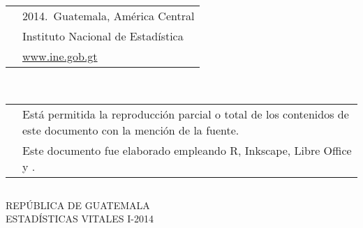 $\ $
\vspace{4.5cm}

\noindent\begin{tabular}{p{0.1cm}p{6.8cm}}
	& 2014.$\,$ Guatemala, América Central \\
	&\Bold Instituto Nacional de Estadística\\[-0.4cm]
	&\color{blue!50!black}\url{www.ine.gob.gt}\\[0.9cm]
\end{tabular}\\
\noindent\begin{tabular}{p{0.1cm}p{6.8cm}}
	& Está permitida la reproducción parcial o total de los contenidos de este documento con la mención de la fuente. \\[0.5cm]
	
	& Este documento fue elaborado empleando  {\Sans R}, Inkscape, Libre Office y {\Logos \XeLaTeX}.\\
\end{tabular} 


\clearpage




$\ $
\vspace{3.5cm}

\begin{center}
	\Bold \LARGE REPÚBLICA DE GUATEMALA\\
	ESTADÍSTICAS VITALES I-2014\
\end{center}
\cleardoublepage

